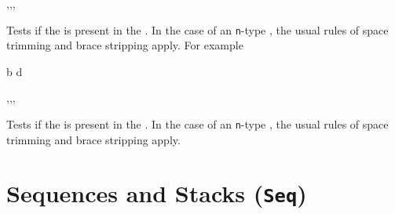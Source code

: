 \documentclass[oneside]{book}
\begin{document}
\begin{function}{\ClistIfIn,\ClistIfInT,\ClistIfInF,\ClistIfInTF}
\begin{syntax}
  
   
   
    
\end{syntax}
Tests if the  is present in the .
In the case of an \texttt{n}-type , the usual rules
of space trimming and brace stripping apply. For example
\begin{demohigh}
 {b} {} {}
 {d} {} {}
\end{demohigh}
\end{function}

\begin{function}{\ClistVarIfIn,\ClistVarIfInT,\ClistVarIfInF,\ClistVarIfInTF}
\begin{syntax}
  
   
   
    
\end{syntax}
Tests if the  is present in the .
In the case of an \texttt{n}-type , the usual rules
of space trimming and brace stripping apply.
\begin{demohigh}
\ClistSet {}
\ClistVarIfInTF {} {} {}
\ClistVarIfInTF {} {} {}
\end{demohigh}
\end{function}

\chapter{Sequences and Stacks (\texttt{Seq})}
\end{document}
